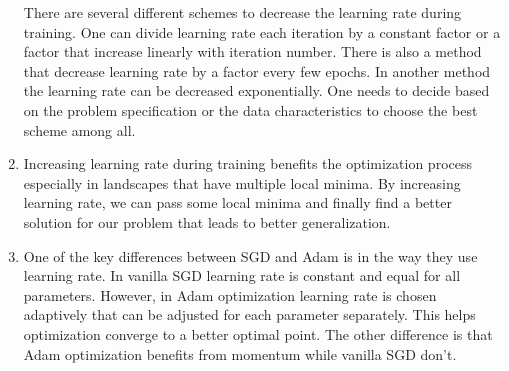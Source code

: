 \documentclass[12]{article}
\begin{document}
\begin{enumerate}[label=\textbf{(\alph*)}]
		There are several different schemes to decrease the learning rate during training. One can divide learning rate each iteration by a constant factor or a factor that increase linearly with iteration number. There is also a method that decrease learning rate by a factor every few epochs. In another method the learning rate can be decreased exponentially. One needs to decide based on the problem specification or the data characteristics to choose the best scheme among all.
		\item
		Increasing learning rate during training benefits the optimization process especially in landscapes that have multiple local minima. By increasing learning rate, we can pass some local minima and finally find a better solution for our problem that leads to better generalization.
		\item
		One of the key differences between SGD and Adam is in the way they use learning rate. In vanilla SGD learning rate is constant and equal for all parameters. However, in Adam optimization learning rate is chosen adaptively that can be adjusted for each parameter separately. This helps optimization converge to a better optimal point. The other difference is that Adam optimization benefits from momentum while vanilla SGD don't.
	\end{enumerate}
	
	\pagebreak
\end{document}
